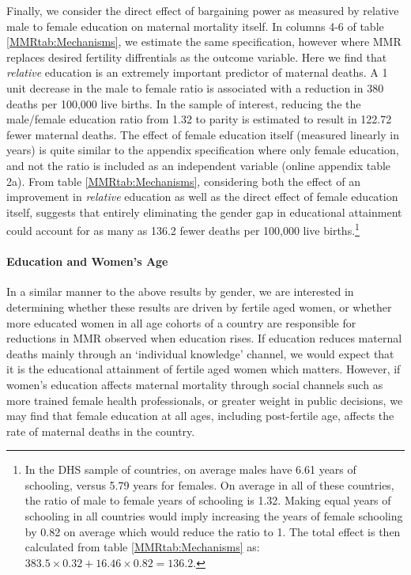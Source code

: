 \documentclass{article}[12pt,subeqn]
\begin{document}
\begin{spacing}{1.4}
Finally, we consider the direct effect of bargaining power as measured by relative
male to female education on maternal mortality itself.  In columns 4-6 of table
\ref{MMRtab:Mechanisms}, we estimate the same specification, however where MMR
replaces desired fertility diffrentials as
the outcome variable.  Here we find that \emph{relative} education is an
extremely important predictor of maternal deaths.  A 1 unit decrease in the male
to female ratio is associated with a reduction in 380 deaths per 100,000 live
births.  In the sample of interest, reducing the the male/female education ratio
from 1.32 to parity is estimated to result in 122.72 fewer maternal deaths.  The
effect of female education itself (measured linearly in years) is quite similar
to the appendix specification where only female education, and not the ratio
is included as an independent variable (online appendix table 2a).  From table
\ref{MMRtab:Mechanisms}, considering both the effect of an improvement in
\emph{relative} education as well as the direct effect of female education itself,
suggests that entirely eliminating the gender gap in educational attainment
could account for as many as 136.2 fewer deaths per 100,000 live births.\footnote{In
  the DHS sample of countries, on average males have 6.61 years of schooling, versus
  5.79 years for females.  On average in all of these countries, the ratio of male to
  female years of schooling is 1.32. Making equal years of schooling in all countries
  would imply increasing the years of female schooling by 0.82 on average which would
  reduce the ratio to 1.  The total effect is then calculated from table
  \ref{MMRtab:Mechanisms} as: $383.5\times 0.32+16.46\times 0.82=136.2$.}


\paragraph{Education and Women's Age}
\label{ssscn:age}
In a similar manner to the above results by gender, we are interested in
determining whether these results are driven by fertile aged women, or whether
more educated women in all age cohorts of a country are responsible for
reductions in MMR observed when education rises.  If education reduces maternal
deaths mainly through an `individual knowledge' channel, we would expect that
it is the educational attainment of fertile aged women which matters.  However,
if women's education affects maternal mortality through social channels such as
more trained female health professionals, or greater weight in public decisions,
we may find that female education at all ages, including post-fertile age, affects
the rate of maternal deaths in the country.


\end{spacing}
\end{document}
